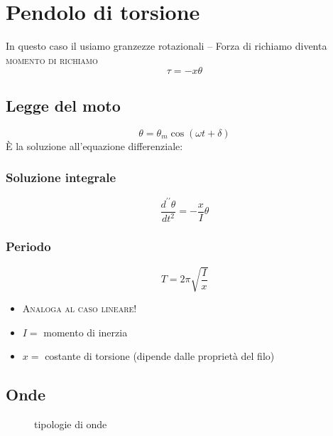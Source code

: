 \documentclass{book}
\begin{document}
\section{Pendolo di torsione}
\label{sec:penditors}

In questo caso il usiamo granzezze rotazionali -- Forza di richiamo diventa \textsc{momento di richiamo}
\begin{equation}
  \label{eq:momedirich}
  \tau=-x\theta
\end{equation}

\subsection{Legge del moto}
\label{sec:leggedelmotopenditors}

\begin{equation}
  \label{eq:leggedelmotopenditors}
  \theta=\theta_m\cos(\omega t+\delta)
\end{equation}
È la soluzione all'equazione differenziale:

\begin{multicols}{2}
  \subsubsection{Soluzione integrale}
  \label{sec:leggedelmotopendditorsintegral}
  \begin{equation}
    \label{eq:leggedelmotopendditorsintegral}
    \frac{d^{\prime\prime}\theta}{dt^2}=-\frac{x}{I}\theta
  \end{equation}
  \subsubsection{Periodo}
  \label{sec:periodoleggedelmotopendditorsione}
  \begin{equation}
    \label{eq:periodoleggedelmotopendditorsione}
    T=2\pi\sqrt{\frac{I}{x}}
  \end{equation}
\end{multicols}
\begin{itemize}
\item \textsc{Analoga al caso lineare!}
\item $I=$ momento di inerzia
\item $x=$ costante di torsione {\color{red}(dipende dalle proprietà del filo)}
\end{itemize}

\subsection{Onde}
\label{sec:onde}
\begin{figure}[ht!]
  \centering
  
  \caption{tipologie di onde}
  \label{fig:tiponde}
\end{figure}
\end{document}
